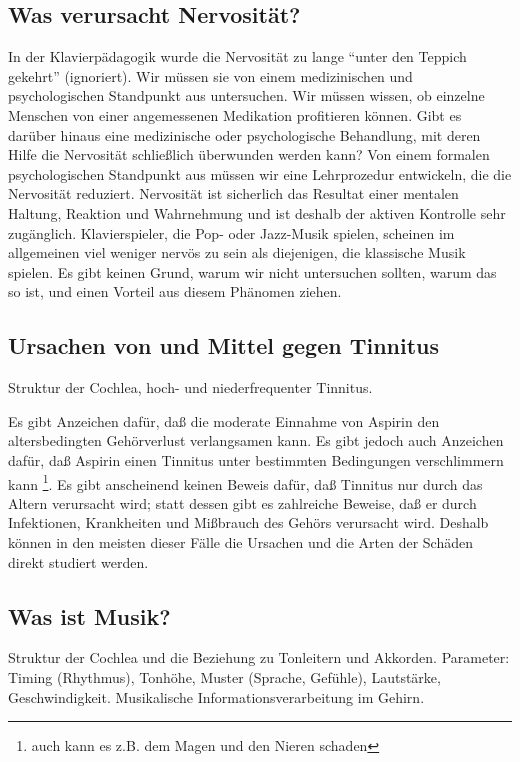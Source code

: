 \subsection{Was verursacht Nervosität?}
\label{c1iv6d}

In der Klavierpädagogik wurde die Nervosität zu lange \enquote{unter den Teppich gekehrt} (ignoriert).
Wir müssen sie von einem medizinischen und psychologischen Standpunkt aus untersuchen.
Wir müssen wissen, ob einzelne Menschen von einer angemessenen Medikation profitieren können.
Gibt es darüber hinaus eine medizinische oder psychologische Behandlung, mit deren Hilfe die Nervosität schließlich überwunden werden kann?
Von einem formalen psychologischen Standpunkt aus müssen wir eine Lehrprozedur entwickeln, die die Nervosität reduziert.
Nervosität ist sicherlich das Resultat einer mentalen Haltung, Reaktion und Wahrnehmung und ist deshalb der aktiven Kontrolle sehr zugänglich.
Klavierspieler, die Pop- oder Jazz-Musik spielen, scheinen im allgemeinen viel weniger nervös zu sein als diejenigen, die klassische Musik spielen.
Es gibt keinen Grund, warum wir nicht untersuchen sollten, warum das so ist, und einen Vorteil aus diesem Phänomen ziehen.


\subsection{Ursachen von und Mittel gegen Tinnitus}
\label{c1iv6e}

Struktur der Cochlea, hoch- und niederfrequenter Tinnitus.

Es gibt Anzeichen dafür, daß die moderate Einnahme von Aspirin den altersbedingten Gehörverlust verlangsamen kann.
Es gibt jedoch auch Anzeichen dafür, daß Aspirin einen Tinnitus unter bestimmten Bedingungen verschlimmern kann \footnote{auch kann es z.B. dem Magen und den Nieren schaden}.
Es gibt anscheinend keinen Beweis dafür, daß Tinnitus nur durch das Altern verursacht wird; statt dessen gibt es zahlreiche Beweise, daß er durch Infektionen, Krankheiten und Mißbrauch des Gehörs verursacht wird.
Deshalb können in den meisten dieser Fälle die Ursachen und die Arten der Schäden direkt studiert werden.


\subsection{Was ist Musik?}
\label{c1iv6f}

Struktur der Cochlea und die Beziehung zu Tonleitern und Akkorden.
Parameter: Timing (Rhythmus), Tonhöhe, Muster (Sprache, Gefühle), Lautstärke, Geschwindigkeit.
Musikalische Informationsverarbeitung im Gehirn.


